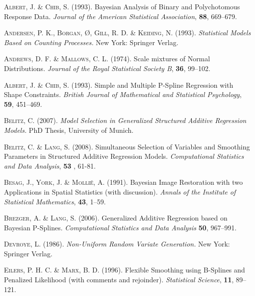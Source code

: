 \documentclass[11pt,a4paper,twoside]{bayesxarticle}
\begin{document}
\begin{thebibliography}{99}


 {\scshape Albert, J. \& Chib, S.} (1993).
 Bayesian Analysis of Binary and Polychotomous Response Data.
 {\it Journal of the American Statistical Association}, {\bf 88}, 669--679.

 {\scshape Andersen, P. K., Borgan, {\O}, Gill, R. D. \& Keiding, N.} (1993).
 {\it Statistical Models Based on Counting Processes.}
 New York: Springer Verlag.

 {\scshape Andrews, D. F. \& Mallows, C. L.} (1974).
 Scale mixtures of Normal Distributions.
 {\it Journal of the Royal Statistical Society B}, {\bf 36}, 99--102.

 {\scshape Albert, J. \& Chib, S.} (1993).
 Simple and Multiple P-Spline Regression with Shape Constraints.
 {\it British Journal of Mathematical and Statistical Psychology}, {\bf 59}, 451--469.

 {\scshape Belitz, C.} (2007).
 {\it Model Selection in Generalized Structured Additive Regression Models.}
 PhD Thesis, University of Munich.

{\scshape Belitz, C. \& Lang, S.} (2008).
 Simultaneous Selection of Variables and Smoothing Parameters in Structured Additive Regression Models.
{\it Computational Statistics and Data Analysis}, {\bf 53} , 61-81.

 {\scshape Besag, J., York, J. \& Molli\'{e}, A.} (1991).
 Bayesian Image Restoration with two Applications in Spatial Statistics (with discussion).
 {\it Annals of the Institute of Statistical Mathematics}, {\bf 43}, 1--59.

 {\scshape Brezger, A. \& Lang, S.} (2006).
 Generalized Additive Regression based on Bayesian P-Splines.
 {\it Computational Statistics and Data Analysis} {\bf 50}, 967--991.

 {\scshape Devroye, L.} (1986).
 {\it Non-Uniform Random Variate Generation.}
 New York: Springer Verlag.

 {\scshape Eilers, P. H. C. \& Marx, B. D.} (1996).
 Flexible Smoothing using B-Splines and Penalized Likelihood (with comments and rejoinder).
 {\it Statistical Science}, {\bf 11}, 89--121.


\end{thebibliography}
\end{document}
